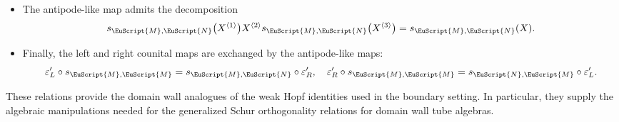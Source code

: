\documentclass[a4paper,11pt]{article}
\theoremstyle{definition}
\theoremstyle{remark}
\newcommand\eK         {\EuScript{K}}
\newcommand\eM          {\EuScript{M}}
\newcommand\eN         {\EuScript{N}}
\begin{document}
\begin{itemize}
    Factorization and reversal of the domain wall orientation commute
    up to interchange of the two tensor factors. Explicitly,
    \begin{equation}
        \delta_{\eN,\eK,\eM} \circ s_{\eM,\eN} = \tau\circ \bigl(s_{\eK,\eN}\otimes s_{\eM,\eK}\bigr) \circ\delta_{\eM,\eK,\eN}.  \label{eq:delta-antipode-compatibility-DW}
    \end{equation} 
    \item
    The antipode-like map admits the decomposition
    \begin{equation} \label{eq:decomp-antipode-DW}
        s_{\eM,\eN}\bigl(X^{\langle 1\rangle}\bigr) X^{\langle 2\rangle} s_{\eM,\eN}\bigl(X^{\langle 3\rangle}\bigr) = s_{\eM,\eN}(X). 
    \end{equation}
    \item
    Finally, the left and right counital maps are exchanged
    by the antipode-like maps:
    \begin{equation}\label{eq:antipode-counital-DW}
        \varepsilon'_{L} \circ s_{\eM,\eM}  = s_{\eM,\eN} \circ \varepsilon'_{R}, \quad  \varepsilon'_{R} \circ s_{\eM,\eM} =  s_{\eN,\eM} \circ \varepsilon'_{L}. 
    \end{equation}

\end{itemize}

These relations provide the domain wall analogues of the weak Hopf
identities used in the boundary setting. In particular, they supply the
algebraic manipulations needed for the generalized Schur orthogonality
relations for domain wall tube algebras.
\end{document}
